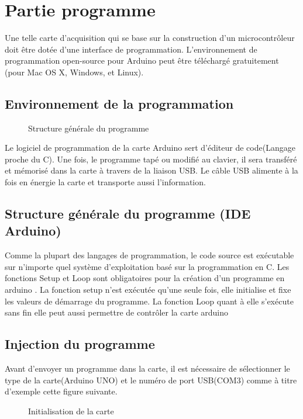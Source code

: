 \documentclass[12pt, openany]{report}
\begin{document}
         		
         		 \section{Partie programme}
         		
         		 Une telle carte d'acquisition qui se base sur la construction d'un microcontrôleur doit être dotée d'une interface de programmation. L'environnement de programmation open-source pour Arduino peut être téléchargé
         		 gratuitement (pour Mac OS X, Windows, et Linux).
         		 \subsection{ Environnement de la programmation}
         		   \begin{figure}[!h]
         		                    \centering
         		  
         		             \caption{Structure générale du programme}
         		                   		          		
         		      \end{figure}
         		 Le logiciel de programmation de la carte Arduino sert d'éditeur de code(Langage
         		 proche du C). Une fois, le programme tapé ou modifié au clavier, il sera transféré et
         		 mémorisé dans la carte à travers de la liaison USB. Le câble USB alimente à la fois en énergie la carte et transporte aussi l'information.
         		 \subsection{Structure générale du programme (IDE Arduino)}
         		 Comme la plupart des langages de programmation, le code source est exécutable sur n'importe quel système d'exploitation basé sur la programmation
         		 en C. Les fonctions Setup et Loop sont obligatoires pour la création d'un programme en arduino .
         		 La fonction setup n'est exécutée qu'une seule fois, elle initialise et fixe les valeurs de démarrage du programme. La fonction Loop quant à elle s'exécute sans fin elle peut aussi permettre de contrôler la carte arduino
 
              		       		
         		
         		 \subsection{Injection du programme}
         		 Avant d'envoyer un programme dans la carte, il est nécessaire de sélectionner le type de la carte(Arduino UNO) et le numéro de port USB(COM3) comme à titre d'exemple cette
         		 figure suivante.
  \begin{figure}[!h]
                \centering

         \caption{Initialisation de la carte }
               		          		
               		          		 \end{figure}
           		       		
\end{document}
